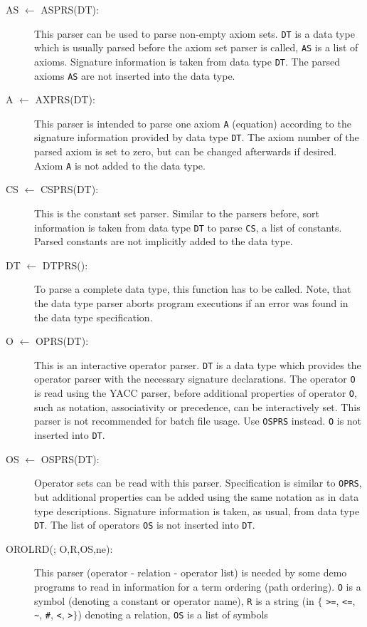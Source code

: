 \begin{description}
\item[AS $\leftarrow$ ASPRS(DT):] This parser can be used to
parse non-empty
axiom sets. {\tt DT} is a data type which is usually parsed before the
axiom set parser is called,
{\tt AS} is a list of axioms.
Signature information is taken from data type {\tt DT}. The parsed
axioms {\tt AS} are not inserted into the data type.
\item[A $\leftarrow$ AXPRS(DT):] This parser is intended to parse one
axiom {\tt A}
(equation) according to the signature information provided by
data type {\tt DT}. The axiom number of the parsed axiom is set to zero,
but can be changed afterwards if desired. Axiom {\tt A} is not added
to the data type.
\item[CS $\leftarrow$ CSPRS(DT):] This is the constant set parser.
Similar to the parsers before, sort information is taken from
data type {\tt DT} to parse {\tt CS}, a list of constants. Parsed
constants are not implicitly added to the data type.
\item[DT $\leftarrow$ DTPRS():] To parse a complete data type,
this function has to be called. Note, that the data type parser
aborts program executions if an error was found in the data type
specification.
\item[O $\leftarrow$ OPRS(DT):] This is an interactive operator parser.
{\tt DT} is a data type which provides the operator parser with
the necessary signature declarations. The operator {\tt O} is
read using the YACC parser, before additional properties of operator
{\tt O}, such as notation, associativity or precedence, can be
interactively set. This parser is not recommended for batch file usage.
Use {\tt OSPRS} instead. {\tt O} is not inserted into {\tt DT}.
\item[OS $\leftarrow$ OSPRS(DT):] Operator sets can be read with this parser.
Specification is similar to {\tt OPRS}, but additional properties
can be added using the same notation as in data type descriptions.
Signature information is taken, as usual, from data type {\tt DT}. The
list of operators {\tt OS} is not inserted into {\tt DT}.
\item[OROLRD(; O,R,OS,ne):] This parser (operator - relation - operator list)
is needed by some demo programs to read in information for a term ordering
(path ordering). 
{\tt O} is a symbol (denoting a constant or operator name), {\tt R} is a
string 
(in $\{$ {\tt >=}, {\tt <=}, {\verb+~+}, {\tt \#}, {\tt <}, {\tt >}$\}$)
denoting a relation, {\tt OS} is a list of symbols 

\end{description}
